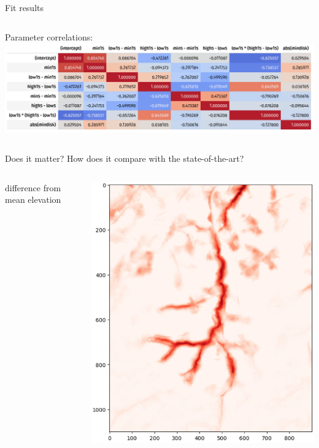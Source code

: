 \documentclass[aspectratio=169]{beamer}
\begin{document}
\begin{frame}{Fit results}
\begin{columns}
\vspace{0.5 cm}

Parameter correlations:
\vspace{0.15 cm}
\includegraphics[width=\linewidth]{img/fit-parameter-correlations.png}
\end{columns}
\end{frame}

\begin{frame}{Does it matter? How does it compare with the state-of-the-art?}
\vspace{0.25 cm}
\begin{columns}
\centering difference from mean elevation

\vspace{0.1 cm}
\includegraphics[width=\linewidth]{img/compare-state-of-the-art.png}


\end{columns}
\end{frame}
\end{document}
